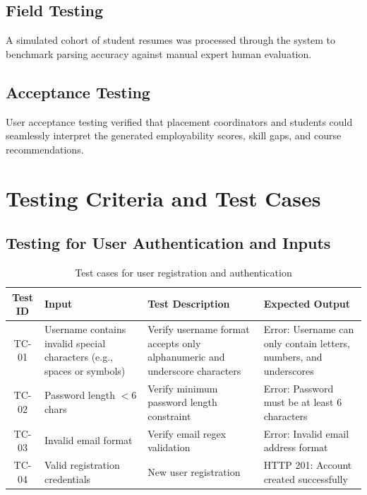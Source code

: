 \documentclass[12pt,a4paper]{report}
\begin{document}
\subsection{Field Testing}
A simulated cohort of student resumes was processed through the system to benchmark parsing accuracy against manual expert human evaluation.

\subsection{Acceptance Testing}
User acceptance testing verified that placement coordinators and students could seamlessly interpret the generated employability scores, skill gaps, and course recommendations.

\newpage
\section{Testing Criteria and Test Cases}

\subsection{Testing for User Authentication and Inputs}
\begin{table}[htbp]
 \caption{Test cases for user registration and authentication}
    \label{tab:test_cases_auth}
    \centering
    \begin{tabularx}{\textwidth}{|c|X|X|X|}
        \hline
        \textbf{Test ID} & \textbf{Input} & \textbf{Test Description} & \textbf{Expected Output} \\
        \hline
        TC-01 & Username contains invalid special characters (e.g., spaces or symbols) & Verify username format accepts only alphanumeric and underscore characters & Error: Username can only contain letters, numbers, and underscores \\
        \hline
        TC-02 & Password length $< 6$ chars & Verify minimum password length constraint & Error: Password must be at least 6 characters \\
        \hline
        TC-03 & Invalid email format & Verify email regex validation & Error: Invalid email address format \\
        \hline
        TC-04 & Valid registration credentials & New user registration & HTTP 201: Account created successfully \\
        \hline
    \end{tabularx} 
\end{table}
\end{document}
